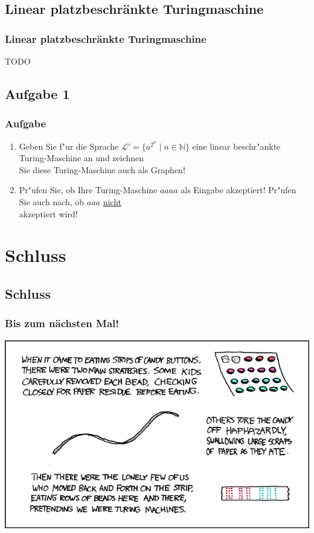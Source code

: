 \subsection{Linear platzbeschränkte Turingmaschine}
\begin{frame}
	\frametitle{Linear platzbeschränkte Turingmaschine}
	TODO
\end{frame}

\subsection{Aufgabe 1}
\begin{frame}
\frametitle{Aufgabe}
\begin{enumerate}
\item Geben Sie f"ur die Sprache $\mathcal{L}' = \{a^{2^n} \; | \; n \in
\mathbb{N}\}$ eine linear beschr"ankte Turing-Maschine an und zeichnen\\
Sie diese Turing-Maschine auch als Graphen!
\item Pr"ufen Sie, ob Ihre Turing-Maschine $aaaa$ als Eingabe akzeptiert!
Pr"ufen Sie auch nach, ob $aaa$ \underline{nicht}\\
akzeptiert wird!
\end{enumerate}
\end{frame}

\section{Schluss}
\subsection{Schluss}
\begin{frame}
\frametitle{Bis zum nächsten Mal!}
\begin{center}
  \includegraphics[width=1 \textheight]{images/xkcd_205.png}
\end{center}
\end{frame}

